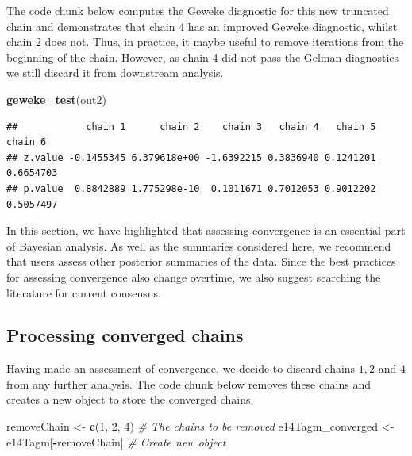 \documentclass[
]{article}
\newenvironment{Shaded}{\begin{snugshade}}{\end{snugshade}}
\newcommand{\CommentTok}[1]{\textcolor[rgb]{0.56,0.35,0.01}{\textit{#1}}}
\newcommand{\DecValTok}[1]{\textcolor[rgb]{0.00,0.00,0.81}{#1}}
\newcommand{\KeywordTok}[1]{\textcolor[rgb]{0.13,0.29,0.53}{\textbf{#1}}}
\newcommand{\NormalTok}[1]{#1}
\newcommand{\OperatorTok}[1]{\textcolor[rgb]{0.81,0.36,0.00}{\textbf{#1}}}
\newcommand{\StringTok}[1]{\textcolor[rgb]{0.31,0.60,0.02}{#1}}
\begin{document}
The code chunk below computes the Geweke diagnostic for this new
truncated chain and demonstrates that chain 4 has an improved Geweke
diagnostic, whilst chain 2 does not. Thus, in practice, it maybe useful
to remove iterations from the beginning of the chain. However, as chain
4 did not pass the Gelman diagnostics we still discard it from
downstream analysis.

\begin{Shaded}
\begin{Highlighting}[]
\KeywordTok{geweke_test}\NormalTok{(out2)}
\end{Highlighting}
\end{Shaded}

\begin{verbatim}
##            chain 1      chain 2    chain 3   chain 4   chain 5   chain 6
## z.value -0.1455345 6.379618e+00 -1.6392215 0.3836940 0.1241201 0.6654703
## p.value  0.8842889 1.775298e-10  0.1011671 0.7012053 0.9012202 0.5057497
\end{verbatim}

In this section, we have highlighted that assessing convergence is an
essential part of Bayesian analysis. As well as the summaries considered
here, we recommend that users assess other posterior summaries of the
data. Since the best practices for assessing convergence also change
overtime, we also suggest searching the literature for current
consensus.

\hypertarget{processing-converged-chains}{%
\subsection{Processing converged
chains}\label{processing-converged-chains}}

Having made an assessment of convergence, we decide to discard chains
\(1,2\) and \(4\) from any further analysis. The code chunk below
removes these chains and creates a new object to store the converged
chains.

\begin{Shaded}
\begin{Highlighting}[]
\NormalTok{removeChain <-}\StringTok{ }\KeywordTok{c}\NormalTok{(}\DecValTok{1}\NormalTok{, }\DecValTok{2}\NormalTok{, }\DecValTok{4}\NormalTok{) }\CommentTok{# The chains to be removed}
\NormalTok{e14Tagm_converged <-}\StringTok{ }\NormalTok{e14Tagm[}\OperatorTok{-}\NormalTok{removeChain] }\CommentTok{# Create new object}
\end{Highlighting}
\end{Shaded}
\end{document}
